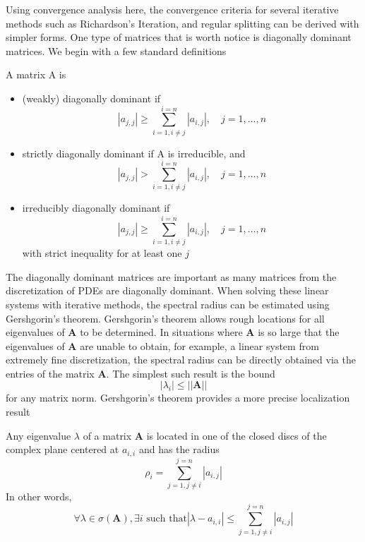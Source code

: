 Using convergence analysis here, the convergence criteria for several iterative methods such as Richardson's Iteration, and regular splitting can be derived with simpler forms. One type of matrices that is worth notice is diagonally dominant matrices. We begin with a few standard definitions
\begin{definition}
    A matrix A is 
    \begin{itemize}
        \item (weakly) diagonally dominant if \begin{equation}
            |a_{j,j}| \geq \sum_{i=1,i\neq j}^{i=n}|a_{i,j}|,\quad j = 1,\dots,n
        \end{equation}
        \item strictly diagonally dominant if A is irreducible, and \begin{equation}
             |a_{j,j}| > \sum_{i=1,i\neq j}^{i=n}|a_{i,j}|,\quad j = 1,\dots,n
        \end{equation}
        \item irreducibly diagonally dominant if \begin{equation}
             |a_{j,j}| \geq \sum_{i=1,i\neq j}^{i=n}|a_{i,j}|,\quad j = 1,\dots,n
        \end{equation} 
        with strict inequality for at least one $j$
    \end{itemize}
\end{definition}

The diagonally dominant matrices are important as many matrices from the discretization of PDEs are diagonally dominant. When solving these linear systems with iterative methods, the spectral radius can be estimated using Gershgorin's theorem. Gershgorin's theorem allows rough locations for all eigenvalues of $\boldsymbol{A}$ to be determined. In situations where $\boldsymbol{A}$ is so large that the eigenvalues of $\boldsymbol{A}$ are unable to obtain, for example, a linear system from extremely fine discretization, the spectral radius can be directly obtained via the entries of the matrix $\boldsymbol{A}$. The simplest such result is the bound \begin{equation}
    |\lambda_i| \leq ||\boldsymbol{A}||
\end{equation}
for any matrix norm. Gershgorin's theorem provides a more precise localization result
\begin{theorem}[Gershgorin]
Any eigenvalue $\lambda$ of a matrix $\boldsymbol{A}$ is located in one of the closed discs of the complex plane centered at $a_{i, i}$ and has the radius
\begin{equation}
    \rho_i = \sum_{j = 1, j \neq i}^{j=n}|a_{i,j}|
\end{equation}
In other words,
\begin{equation}
    \forall \lambda \in \sigma(\boldsymbol{A}), \exists  i \text{ such that} |\lambda - a_{i,i}| \leq \sum_{j = 1, j \neq i}^{j = n}|a_{i,j}|
\end{equation}
\end{theorem}

